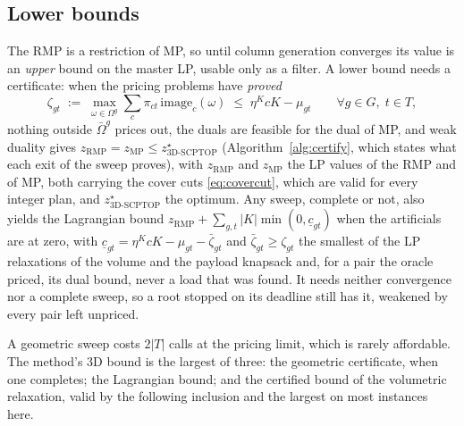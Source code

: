 \subsection{Lower bounds}
\label{sec:bounds}

The RMP is a restriction of MP, so until column generation converges
its value is an \emph{upper} bound on the master LP, usable only as a
filter. A lower bound needs a certificate: when the pricing problems
have \emph{proved}
\begin{equation*}
\zeta_{gt}\;:=\;\max_{\omega\in\Omega^{g}}\sum_{c}\pi_{ct}\,\mathrm{image}_{c}(\omega)
\;\le\;\eta^{K}cK-\mu_{gt}
\qquad\forall g\in G,\; t\in T,
\end{equation*}
nothing outside $\bar\Omega^{g}$ prices out, the duals are feasible for
the dual of MP, and weak duality gives
$z_{\mathrm{RMP}}=z_{\mathrm{MP}}\le z^{\star}_{\text{3D-SCPTOP}}$
(Algorithm~\ref{alg:certify}, which states what each exit of the sweep
proves), with $z_{\mathrm{RMP}}$ and $z_{\mathrm{MP}}$ the LP values of
the RMP and of MP, both carrying the cover cuts \eqref{eq:covercut},
which are valid for every integer plan, and
$z^{\star}_{\text{3D-SCPTOP}}$ the optimum. Any sweep, complete or
not, also yields the Lagrangian bound
$z_{\mathrm{RMP}}+\sum_{g,t}|K|\min(0,\underline{c}_{gt})$ when the
artificials are at zero, with
$\underline{c}_{gt}=\eta^{K}cK-\mu_{gt}-\bar\zeta_{gt}$ and
$\bar\zeta_{gt}\ge\zeta_{gt}$ the smallest of the LP relaxations of
the volume and the payload knapsack and, for a pair the oracle priced,
its dual bound, never a load that was found.
It needs neither convergence nor a complete sweep, so a root stopped on
its deadline still has it, weakened by every pair left unpriced.



A geometric sweep costs $2|T|$ calls at the pricing limit, which is
rarely affordable. The method's 3D bound is the largest of three: the
geometric certificate, when one completes; the Lagrangian bound; and
the certified bound of the volumetric relaxation, valid by the
following inclusion and the largest on most instances here.

